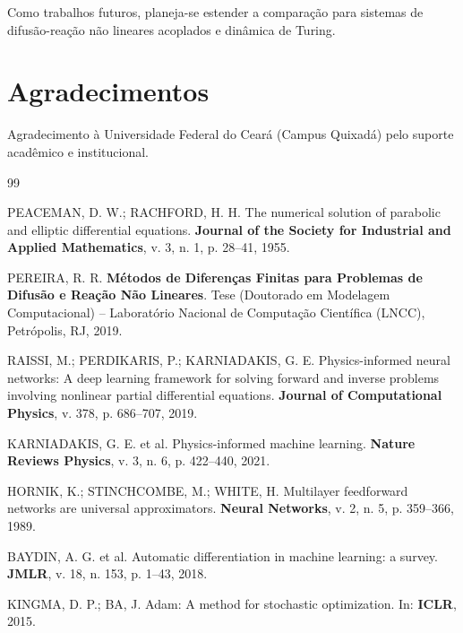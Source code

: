 \documentclass[11pt,a4paper]{article}
\begin{document}
Como trabalhos futuros, planeja-se estender a comparação para sistemas de difusão-reação não lineares acoplados e dinâmica de Turing.

\section*{Agradecimentos}
Agradecimento à Universidade Federal do Ceará (Campus Quixadá) pelo suporte acadêmico e institucional.

\begin{thebibliography}{99}
\setlength{\itemsep}{0.5pt}
\setlength{\parskip}{0pt}
\small

PEACEMAN, D. W.; RACHFORD, H. H. The numerical solution of parabolic and elliptic differential equations. \textbf{Journal of the Society for Industrial and Applied Mathematics}, v. 3, n. 1, p. 28--41, 1955.

PEREIRA, R. R. \textbf{Métodos de Diferenças Finitas para Problemas de Difusão e Reação Não Lineares}. Tese (Doutorado em Modelagem Computacional) -- Laboratório Nacional de Computação Científica (LNCC), Petrópolis, RJ, 2019.

RAISSI, M.; PERDIKARIS, P.; KARNIADAKIS, G. E. Physics-informed neural networks: A deep learning framework for solving forward and inverse problems involving nonlinear partial differential equations. \textbf{Journal of Computational Physics}, v. 378, p. 686--707, 2019.

KARNIADAKIS, G. E. et al. Physics-informed machine learning. \textbf{Nature Reviews Physics}, v. 3, n. 6, p. 422--440, 2021.

HORNIK, K.; STINCHCOMBE, M.; WHITE, H. Multilayer feedforward networks are universal approximators. \textbf{Neural Networks}, v. 2, n. 5, p. 359--366, 1989.

BAYDIN, A. G. et al. Automatic differentiation in machine learning: a survey. \textbf{JMLR}, v. 18, n. 153, p. 1--43, 2018.

KINGMA, D. P.; BA, J. Adam: A method for stochastic optimization. In: \textbf{ICLR}, 2015.

\end{thebibliography}
\end{document}
